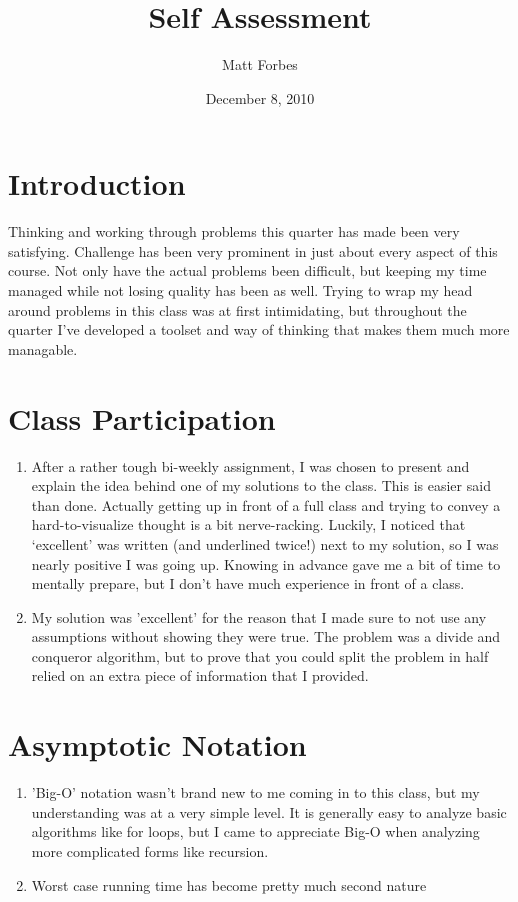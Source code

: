 \documentclass[a4paper,12pt]{article}
\begin{document}
\title{Self Assessment}
\author{Matt Forbes}
\date{December 8, 2010}
\maketitle

\section*{Introduction}

Thinking and working through problems this quarter has made been very
satisfying. Challenge has been very prominent in just about every
aspect of this course. Not only have the actual problems been
difficult, but keeping my time managed while not losing quality has
been as well. Trying to wrap my head around problems in this class was
at first intimidating, but throughout the quarter I've developed a
toolset and way of thinking that makes them much more managable.

\section*{Class Participation}

\begin{enumerate}[]

\item After a rather tough bi-weekly assignment, I was chosen to
  present and explain the idea behind one of my solutions to the
  class. This is easier said than done.  Actually getting up in front
  of a full class and trying to convey a hard-to-visualize thought is
  a bit nerve-racking. Luckily, I noticed that `excellent' was written
  (and underlined twice!) next to my solution, so I was nearly
  positive I was going up. Knowing in advance gave me a bit of time to
  mentally prepare, but I don't have much experience in front of a
  class.

\item My solution was 'excellent' for the reason that I made sure to
  not use any assumptions without showing they were true. The problem
  was a divide and conqueror algorithm, but to prove that you could
  split the problem in half relied on an extra piece of information
  that I provided.

\end{enumerate}

\section*{Asymptotic Notation}

\begin{enumerate}[]

\item 'Big-O' notation wasn't brand new to me coming in to this class,
  but my understanding was at a very simple level. It is generally
  easy to analyze basic algorithms like for loops, but I came to
  appreciate Big-O when analyzing more complicated forms like
  recursion.

\item Worst case running time has become pretty much second nature

\end{enumerate}
\end{document}
